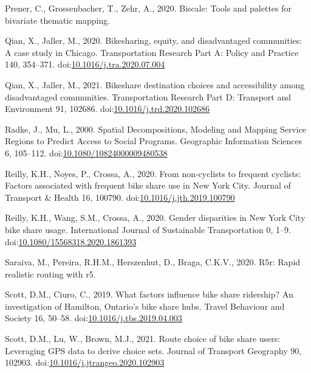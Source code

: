 \documentclass[]{elsarticle} %
\begin{document}
\leavevmode\hypertarget{ref-R-biscale}{}%
Prener, C., Grossenbacher, T., Zehr, A., 2020. Biscale: Tools and
palettes for bivariate thematic mapping.

\leavevmode\hypertarget{ref-qianBikesharingEquityDisadvantaged2020}{}%
Qian, X., Jaller, M., 2020. Bikesharing, equity, and disadvantaged
communities: A case study in Chicago. Transportation Research Part A:
Policy and Practice 140, 354--371.
doi:\href{https://doi.org/10.1016/j.tra.2020.07.004}{10.1016/j.tra.2020.07.004}

\leavevmode\hypertarget{ref-qianBikeshareDestinationChoices2021}{}%
Qian, X., Jaller, M., 2021. Bikeshare destination choices and
accessibility among disadvantaged communities. Transportation Research
Part D: Transport and Environment 91, 102686.
doi:\href{https://doi.org/10.1016/j.trd.2020.102686}{10.1016/j.trd.2020.102686}

\leavevmode\hypertarget{ref-radkeSpatialDecompositionsModeling2000}{}%
Radke, J., Mu, L., 2000. Spatial Decompositions, Modeling and Mapping
Service Regions to Predict Access to Social Programs. Geographic
Information Sciences 6, 105--112.
doi:\href{https://doi.org/10.1080/10824000009480538}{10.1080/10824000009480538}

\leavevmode\hypertarget{ref-reillyNoncyclistsFrequentCyclists2020}{}%
Reilly, K.H., Noyes, P., Crossa, A., 2020. From non-cyclists to frequent
cyclists: Factors associated with frequent bike share use in New York
City. Journal of Transport \& Health 16, 100790.
doi:\href{https://doi.org/10.1016/j.jth.2019.100790}{10.1016/j.jth.2019.100790}

\leavevmode\hypertarget{ref-reillyGenderDisparitiesNew2020}{}%
Reilly, K.H., Wang, S.M., Crossa, A., 2020. Gender disparities in New
York City bike share usage. International Journal of Sustainable
Transportation 0, 1--9.
doi:\href{https://doi.org/10.1080/15568318.2020.1861393}{10.1080/15568318.2020.1861393}

\leavevmode\hypertarget{ref-R-r5r}{}%
Saraiva, M., Pereira, R.H.M., Herszenhut, D., Braga, C.K.V., 2020. R5r:
Rapid realistic routing with r5.

\leavevmode\hypertarget{ref-scottWhatFactorsInfluence2019}{}%
Scott, D.M., Ciuro, C., 2019. What factors influence bike share
ridership? An investigation of Hamilton, Ontario's bike share hubs.
Travel Behaviour and Society 16, 50--58.
doi:\href{https://doi.org/10.1016/j.tbs.2019.04.003}{10.1016/j.tbs.2019.04.003}

\leavevmode\hypertarget{ref-scottRouteChoiceBike2021}{}%
Scott, D.M., Lu, W., Brown, M.J., 2021. Route choice of bike share
users: Leveraging GPS data to derive choice sets. Journal of Transport
Geography 90, 102903.
doi:\href{https://doi.org/10.1016/j.jtrangeo.2020.102903}{10.1016/j.jtrangeo.2020.102903}
\end{document}
